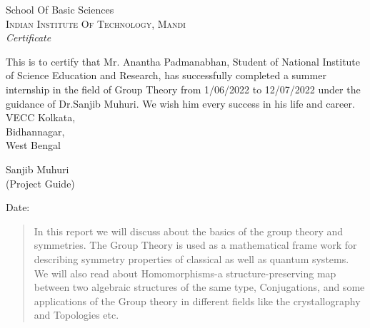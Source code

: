 \documentclass{article}
\begin{document}
\newpage
\thispagestyle{empty}

\begin{center}

\huge{School Of Basic Sciences}\\[0.5cm]
\normalsize
\textsc{Indian Institute Of Technology, Mandi}\\[2.0cm]

\emph{\LARGE Certificate}\\[1cm]
\end{center}
This is to certify that Mr. Anantha Padmanabhan, Student of 
National Institute of Science Education and Research, has 
successfully completed a summer internship in the field of 
Group Theory from 1/06/2022 to 12/07/2022 under the guidance 
of Dr.Sanjib Muhuri. We wish him every success 
in his life and career.\\


VECC Kolkata,\\
Bidhannagar,\\
West Bengal\\
\normalsize 


\vfill


\begin{flushright}
Sanjib Muhuri\\
(Project Guide)\\
\end{flushright}
\begin{flushleft}
Date:
\end{flushleft}
\restoregeometry













\begin{abstract}
    In this report we will discuss about the basics of the group theory and symmetries.
    The Group Theory is used as a mathematical frame work for describing symmetry properties 
    of classical as well as quantum systems. We will also read about Homomorphisms-a 
    structure-preserving map between two algebraic structures of the same type, 
    Conjugations, and some applications of the Group theory in different fields 
    like the crystallography and Topologies etc. 
    \end{abstract}
\restoregeometry
\end{document}
